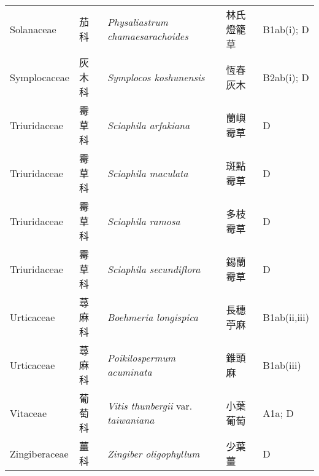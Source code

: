 {\begin{longtable}{p{2.5cm}p{2.5cm}p{4.5cm}p{2.5cm}p{3cm}}
    Solanaceae & 茄科 & \textit{Physaliastrum chamaesarachoides}  & 林氏燈籠草 & B1ab(i); D \index{Physaliastrum@\textit{Physaliastrum}!chamaesarachoides@\textit{chamaesarachoides}}  \index{林氏燈籠草} \\
    Symplocaceae & 灰木科 & \textit{Symplocos koshunensis}  & 恆春灰木 & B2ab(i); D \index{Symplocos@\textit{Symplocos}!koshunensis@\textit{koshunensis}}  \index{恆春灰木} \\
    Triuridaceae & 霉草科 & \textit{Sciaphila arfakiana}  & 蘭嶼霉草 & D \index{Sciaphila@\textit{Sciaphila}!arfakiana@\textit{arfakiana}}  \index{蘭嶼霉草} \\
    Triuridaceae & 霉草科 & \textit{Sciaphila maculata}  & 斑點霉草 & D \index{Sciaphila@\textit{Sciaphila}!maculata@\textit{maculata}}  \index{斑點霉草} \\
    Triuridaceae & 霉草科 & \textit{Sciaphila ramosa}  & 多枝霉草 & D \index{Sciaphila@\textit{Sciaphila}!ramosa@\textit{ramosa}}  \index{多枝霉草} \\
    Triuridaceae & 霉草科 & \textit{Sciaphila secundiflora}  & 錫蘭霉草 & D \index{Sciaphila@\textit{Sciaphila}!secundiflora@\textit{secundiflora}}  \index{錫蘭霉草} \\
    Urticaceae & 蕁麻科 & \textit{Boehmeria longispica}  & 長穗苧麻 & B1ab(ii,iii) \index{Boehmeria@\textit{Boehmeria}!longispica@\textit{longispica}}  \index{長穗苧麻} \\
    Urticaceae & 蕁麻科 & \textit{Poikilospermum acuminata}  & 錐頭麻 & B1ab(iii) \index{Poikilospermum@\textit{Poikilospermum}!acuminata@\textit{acuminata}}  \index{錐頭麻} \\
    Vitaceae & 葡萄科 & \textit{Vitis thunbergii} var. \textit{taiwaniana}  & 小葉葡萄 & A1a; D \index{Vitis@\textit{Vitis}!thunbergii@\textit{thunbergii}!var. taiwaniana@var. \textit{taiwaniana}}  \index{小葉葡萄} \\
    Zingiberaceae & 薑科 & \textit{Zingiber oligophyllum}  & 少葉薑 & D \index{Zingiber@\textit{Zingiber}!oligophyllum@\textit{oligophyllum}}  \index{少葉薑} \\
    \bottomrule
        \end{longtable}
        }
    